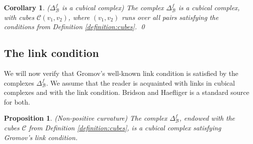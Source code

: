 \documentclass{amsart}
\newtheorem{corollary}[theorem]{Corollary}
\newtheorem{proposition}[theorem]{Proposition}
\newtheorem{standing assumption}[theorem]{Standing Assumption}
\begin{document}
\begin{corollary}
($\Delta^{f}_{\mathcal{B}}$ is a cubical complex)
The complex $\Delta^{f}_{\mathcal{B}}$ is a cubical complex, with cubes $\mathcal{C}(v_{1},v_{2})$,
where $(v_{1},v_{2})$ runs over all pairs satisfying the conditions from Definition \ref{definition:cubes}. \qed
\end{corollary}

\subsection{The link condition}

We will now verify that Gromov's well-known link condition is satisfied by the complexes $\Delta^{f}_{\mathcal{B}}$. We assume that the reader is acquainted with links in cubical complexes and with the link condition. Bridson and Haefliger \cite{BH} is a standard source for both.

\begin{proposition} (Non-positive curvature) \label{proposition:nonpos}
The complex $\Delta^{f}_{\mathcal{B}}$, endowed with the cubes $\mathcal{C}$ from Definition
\ref{definition:cubes}, is a cubical complex satisfying Gromov's link condition.
\end{proposition}
\end{document}
